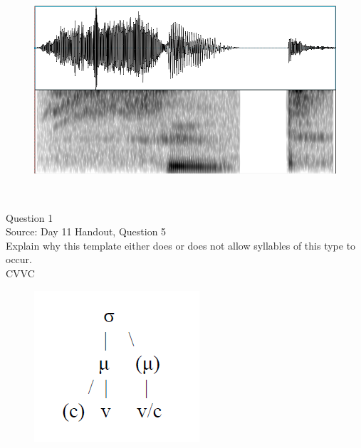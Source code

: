 \documentclass[12pt]{article}
\begin{document}
\begin{figure}[H]
\includegraphics{../images/spectrogram_suit.png}
\end{figure}

\newpage

\begin{center}
\textbf{{\color{red}{\HUGE END OF EXAM}}}\\

\end{center}
\newpage

\begin{center}
\textbf{{\color{blue}{\HUGE START OF EXAM\\}}}

\textbf{{\color{blue}{\HUGE Student ID: 2931\\}}}

\textbf{{\color{blue}{\HUGE 2:40 - 3:00 PM\\}}}

\end{center}
\newpage

{\large Question 1}\\

Source: Day 11 Handout, Question 5\\

Explain why this template either does or does not allow syllables of this type to occur.\\

CVVC

\begin{figure}[H]
\includegraphics{../images/ponapean_syllabletemplate.png}
\end{figure}
\end{document}
